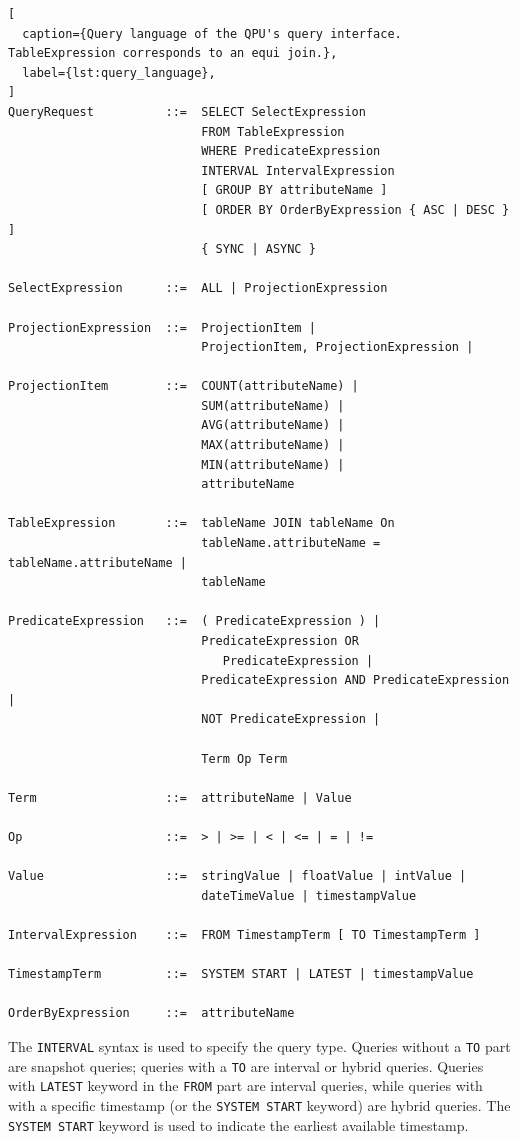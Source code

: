 \begin{lstlisting}[
  caption={Query language of the QPU's query interface. TableExpression corresponds to an equi join.},
  label={lst:query_language},
]
QueryRequest          ::=  SELECT SelectExpression
                           FROM TableExpression
                           WHERE PredicateExpression
                           INTERVAL IntervalExpression
                           [ GROUP BY attributeName ]
                           [ ORDER BY OrderByExpression { ASC | DESC } ]
                           { SYNC | ASYNC }

SelectExpression      ::=  ALL | ProjectionExpression

ProjectionExpression  ::=  ProjectionItem |
                           ProjectionItem, ProjectionExpression |

ProjectionItem        ::=  COUNT(attributeName) |
                           SUM(attributeName) |
                           AVG(attributeName) |
                           MAX(attributeName) |
                           MIN(attributeName) |
                           attributeName

TableExpression       ::=  tableName JOIN tableName On
                           tableName.attributeName = tableName.attributeName |
                           tableName

PredicateExpression   ::=  ( PredicateExpression ) |
                           PredicateExpression OR
                              PredicateExpression |
                           PredicateExpression AND PredicateExpression |
                           NOT PredicateExpression |

                           Term Op Term

Term                  ::=  attributeName | Value

Op                    ::=  > | >= | < | <= | = | !=

Value                 ::=  stringValue | floatValue | intValue |
                           dateTimeValue | timestampValue

IntervalExpression    ::=  FROM TimestampTerm [ TO TimestampTerm ]

TimestampTerm         ::=  SYSTEM START | LATEST | timestampValue

OrderByExpression     ::=  attributeName

\end{lstlisting}

The \texttt{INTERVAL} syntax is used to specify the query type.
Queries without a \texttt{TO} part are snapshot queries;
queries with a \texttt{TO} are interval or hybrid queries.
Queries with \texttt{LATEST} keyword in the \texttt{FROM} part are interval queries,
while queries with with a specific timestamp (or the \texttt{SYSTEM START} keyword) are
hybrid queries.
The \texttt{SYSTEM START} keyword is used to indicate the earliest available timestamp.

